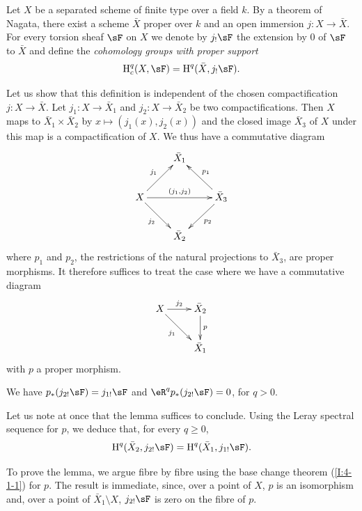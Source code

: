 \begin{definition}\label{I:4-5-1}
Let $X$ be a separated scheme of finite type over a field $k$. By a
theorem of Nagata, there exist a scheme $\bar X$ proper over $k$ and an
open immersion $j:X\to\bar X$. For every torsion sheaf $\sF$ on $X$ we
denote by $j_! \sF$ the extension by $0$ of $\sF$ to $\bar X$ and define the
\emph{cohomology groups with proper support}
\[
  \h_c^q(X,\sF)=\h^q(\bar X, j_! \sF) \text{.}
\]
\end{definition}

Let us show that this definition is independent of the chosen
compactification $j:X\to\bar X$. Let $j_1:X\to \bar X_1$ and $j_2:X\to \bar X_2$
be two compactifications. Then $X$ maps to $\bar X_1\times \bar X_2$ by
$x\mapsto (j_1(x),j_2(x))$ and the closed image $\bar X_3$ of $X$ under this
map is a compactification of $X$. We thus have a commutative diagram
\[\xymatrix{
  & \bar X_1 \\
  X \ar[ur]^-{j_1} \ar[rr]^-{(j_1,j_2)} \ar[dr]_-{j_2}
    & & \bar X_3 \ar[ul]_-{p_1} \ar[dl]^-{p_2} \\
  & \bar X_2
}\]
where $p_1$ and $p_2$, the restrictions of the natural projections to
$\bar X_3$, are proper morphisms. It therefore suffices to treat the case where
we have a commutative diagram
\[\xymatrix{
  X \ar[r]^-{j_2} \ar[dr]_-{j_1}
    & \bar X_2 \ar[d]^-p \\
  & \bar X_1
}\]
with $p$ a proper morphism. 





\begin{lemma}\label{I:4-5-2}
We have $p_*(j_{2!} \sF) = j_{1!} \sF$ and $\eR^q p_*(j_{2!} \sF) = 0$, for $q>0$.
\end{lemma}

Let us note at once that the lemma suffices to conclude. Using the
Leray spectral sequence for $p$, we deduce that, for every
$q\geqslant 0$,
\[
  \h^q(\bar X_2, j_{2!} \sF) = \h^q(\bar X_1, j_{1!} \sF) \text{.}
\]

To prove the lemma, we argue fibre by fibre using the base change
theorem (\ref{I:4-1-1}) for $p$. The result is immediate, since,
over a point of $X$, $p$ is an isomorphism and, over a point of
$\bar X_1\setminus X$, $j_{2!} \sF$ is zero on the fibre of $p$. 





\subsubsection{}\label{I:4-5-3}

